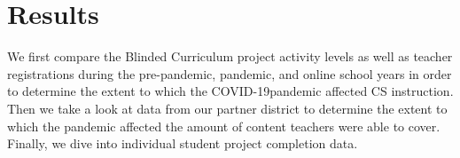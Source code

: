 \documentclass[sigconf,manuscript,review,anonymous]{acmart} %
\def\ts{TIPP\&SEE}
\def\cvd{COVID-19}
\newcommand{\Scratchencore}[0]{Blinded Curriculum}
\begin{document}




\section{Results}

We first compare the \Scratchencore{} project activity levels as well as teacher registrations
during the pre-pandemic, pandemic,
and online school years in order to determine the extent to which the \cvd pandemic affected
CS instruction. Then we take a look at data from our partner district to determine the extent
to which the pandemic affected the amount of content teachers were able to cover. Finally,
we dive into individual student project completion data.
\end{document}
